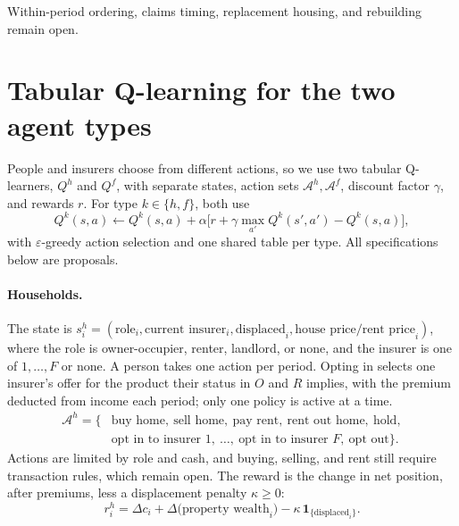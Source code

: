 \documentclass[11pt]{article}
\begin{document}
Within-period ordering, claims timing, replacement housing, and rebuilding remain open.

\section{Tabular Q-learning for the two agent types}
People and insurers choose from different actions, so we use two tabular Q-learners, $Q^{h}$ and $Q^{f}$, with separate states, action sets $\mathcal{A}^{h},\mathcal{A}^{f}$, discount factor $\gamma$, and rewards $r$. For type $k\in\{h,f\}$, both use
\begin{equation}
 Q^{k}(s,a)\gets Q^{k}(s,a)+\alpha\Big[r+\gamma\max_{a'}Q^{k}(s',a')-Q^{k}(s,a)\Big],
\end{equation}
with $\varepsilon$-greedy action selection and one shared table per type. All specifications below are proposals.

\paragraph{Households.} The state is $s^{h}_i=(\text{role}_i,\text{current insurer}_i,\text{displaced}_i, \text{house price/rent price}_i)$, where the role is owner-occupier, renter, landlord, or none, and the insurer is one of $1,\ldots,F$ or none. A person takes one action per period. Opting in selects one insurer's offer for the product their status in $O$ and $R$ implies, with the premium deducted from income each period; only one policy is active at a time.
\begin{equation}
\begin{aligned}
 \mathcal{A}^{h}=\{&\text{buy home},\ \text{sell home},\ \text{pay rent},\ \text{rent out home},\ \text{hold},\\
 &\text{opt in to insurer }1,\ \ldots,\ \text{opt in to insurer }F,\ \text{opt out}\}.
\end{aligned}
\end{equation}
Actions are limited by role and cash, and buying, selling, and rent still require transaction rules, which remain open. The reward is the change in net position, after premiums, less a displacement penalty $\kappa\ge0$:
\begin{equation}
 r^{h}_i=\Delta c_i+\Delta\big(\text{property wealth}_i\big)-\kappa\,\mathbf{1}_{\{\text{displaced}_i\}}.
\end{equation}
\end{document}
